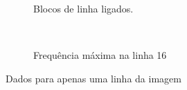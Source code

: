 \documentclass[10pt,a4paper]{article}
\begin{document}
\begin{figure}
    \begin{subfigure}[!ht]{\textwidth}
    \centering
        \caption{Blocos de linha ligados.}
        \label{fig:line_attached}
    \end{subfigure}
    \\
    \begin{subfigure}[!ht]{0.45\textwidth}
        \caption{Frequência máxima na linha 16}
        \label{fig:line_freq}
    \end{subfigure}
    \caption{Dados para apenas uma linha da imagem}
    \label{fig:line}
\end{figure}
\end{document}
